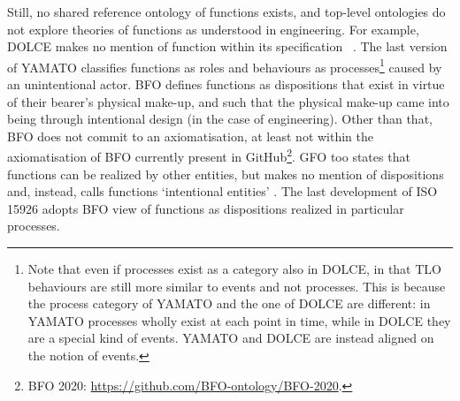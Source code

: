 \documentclass[sw]{iosart2x}
\newcommand{\DOLCE}{\textsc{DOLCE}\xspace} %
\newcommand{\YAMATO}{\textsc{YAMATO}\xspace}
\newcommand{\BFO}{\textsc{BFO}\xspace}
\newcommand{\GFO}{\textsc{GFO}\xspace}
\newcommand{\TLO}{\textnormal{TLO}\xspace}
\newcommand{\quotes}[1]{`#1'}
\newcommand{\TODO}[1]{{%
}}
\begin{document}
Still, no shared reference ontology of functions exists, and top-level ontologies do not explore theories of functions as understood in engineering. 
For example, \DOLCE makes no mention of function within its specification  ~\cite{masoloWonderWebDeliverableD182003}. %
The last version of \YAMATO classifies functions as roles and behaviours as processes\footnote{Note that even if processes exist as a category also in \DOLCE, in that \TLO behaviours are still more similar to events and not processes. This is because the process category of \YAMATO and the one of \DOLCE are different: in \YAMATO processes wholly exist at each point in time, while in \DOLCE they are a special kind of events. \YAMATO  and \DOLCE are instead aligned on the notion of events. %
} 
caused by an unintentional actor. %
\BFO defines functions as dispositions %
that exist in virtue of their bearer's physical make-up, and such that the physical make-up came into being through intentional design (in the case of engineering). Other than that, \BFO does not commit to an axiomatisation, at least not within the axiomatisation of BFO currently present in GitHub\footnote{BFO 2020: \url{https://github.com/BFO-ontology/BFO-2020}.}.
\GFO too states that functions can be realized by other entities, but makes no mention of dispositions and, instead, calls functions \quotes{intentional entities} \cite{herreGeneralFormalOntology2006}.
The last development of ISO 15926 \cite{kluwerISO159261420202020} adopts \BFO view of functions as dispositions realized in particular processes.
\end{document}
